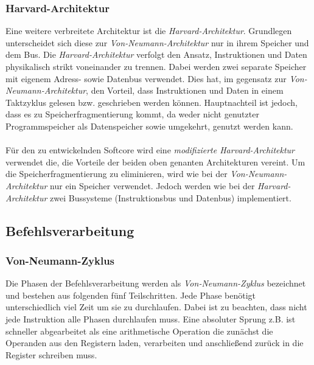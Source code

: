                 \subsubsection{Harvard-Architektur}\label{lab:havard}
                    Eine weitere verbreitete Architektur ist die \textit{Harvard-Architektur}.
                    Grundlegen unterscheidet sich diese zur \textit{Von-Neumann-Architektur}
                    nur in ihrem Speicher und dem Bus. Die \textit{Harvard-Architektur} verfolgt den Ansatz,
                    Instruktionen und Daten physikalisch strikt voneinander zu trennen.
                    Dabei werden zwei separate Speicher mit eigenem Adress- sowie Datenbus verwendet.
                    Dies hat, im gegensatz zur \textit{Von-Neumann-Architektur}, den Vorteil, dass Instruktionen
                    und Daten in einem Taktzyklus gelesen bzw. geschrieben werden können. Hauptnachteil ist jedoch,
                    dass es zu Speicherfragmentierung kommt, da weder nicht genutzter Programmspeicher als Datenspeicher
                    sowie umgekehrt, genutzt werden kann.
                    \\\\
                    Für den zu entwickelnden Softcore wird eine \textit{modifizierte Harvard-Architektur} verwendet die,
                    die Vorteile der beiden oben genanten Architekturen vereint. Um die Speicherfragmentierung zu eliminieren, 
                    wird wie bei der \textit{Von-Neumann-Architektur} nur ein Speicher verwendet.
                    Jedoch werden wie bei der \textit{Harvard-Architektur} zwei Bussysteme (Instruktionsbus und Datenbus)
                    implementiert. 

        \subsection{Befehlsverarbeitung}

            \subsubsection{Von-Neumann-Zyklus}
                Die Phasen der Befehlsverarbeitung werden als \textit{Von-Neumann-Zyklus}
                bezeichnet und bestehen aus folgenden fünf Teilschritten.
                Jede Phase benötigt unterschiedlich viel Zeit um sie zu durchlaufen.
                Dabei ist zu beachten, dass nicht jede Instruktion alle Phasen durchlaufen muss.
                Eine absoluter Sprung z.B. ist schneller abgearbeitet als eine arithmetische
                Operation die zunächst die Operanden aus den Registern laden,
                verarbeiten und anschließend zurück in die Register schreiben muss.
            
